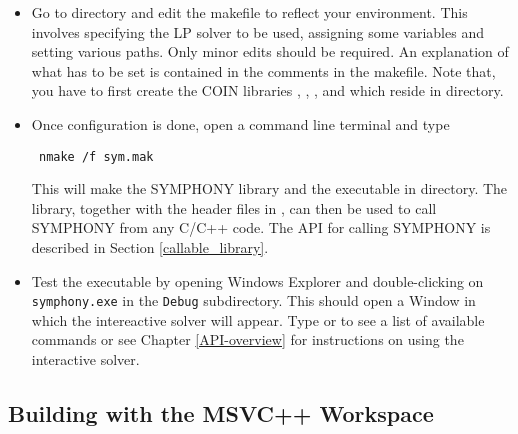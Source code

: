 \begin{itemize}
\item Go to  directory and edit the  
makefile to reflect 
your environment. This involves specifying the LP solver to be used, 
assigning some variables and  setting various paths. Only minor edits 
should be required. An explanation of what has to be set is contained in the 
comments in the makefile.  Note that, you have to first create the COIN 
libraries , , ,  and  
which reside in  directory.

\item Once configuration is done, open a command line terminal and type 
{\color{Brown}
\begin{verbatim}
 nmake /f sym.mak
\end{verbatim}
}
This will make the SYMPHONY library  and the executable 
 in  directory. The library, together with the 
header files in , can then be used to call 
SYMPHONY from any C/C++ code. The API for calling SYMPHONY is described in 
Section \ref{callable_library}.

\item Test the executable by opening Windows Explorer and double-clicking
on {\color{Brown}\texttt{symphony.exe}} in the
{\color{Brown}\texttt{Debug\bs}} subdirectory. This should open a Window in
which the intereactive solver will appear. Type  or  to see
a list of available commands or see Chapter \ref{API-overview} for
instructions on using the interactive solver.

\end{itemize}

\subsection{Building with the MSVC++ Workspace}
\label{using_msvc}

